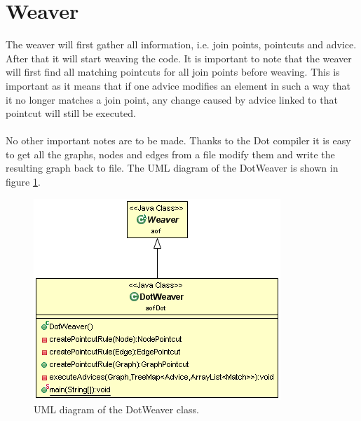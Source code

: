 \documentclass[a4paper]{report}
\begin{document}
\section{Weaver}
The weaver will first gather all information, i.e. join points, pointcuts and advice. After that it will start weaving the code. It is important to note that the weaver will first find all matching pointcuts for all join points before weaving. This is important as it means that if one advice modifies an element in such a way that it no longer matches a join point, any change caused by advice linked to that pointcut will still be executed.\\
\\
No other important notes are to be made. Thanks to the Dot compiler it is easy to get all the graphs, nodes and edges from a file modify them and write the resulting graph back to file. The UML diagram of the DotWeaver is shown in figure \ref{fig:DotWeaver}.\\
\begin{figure}[h!]
\centering
\includegraphics[scale=0.7]{images/AOFDot/DotWeaver.png}
\caption{UML diagram of the DotWeaver class.}
\label{fig:DotWeaver}
\end{figure}
\end{document}
